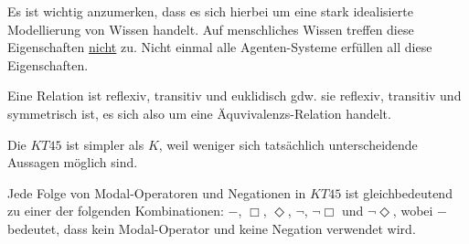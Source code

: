 Es ist wichtig anzumerken, dass es sich hierbei um eine stark idealisierte Modellierung von Wissen handelt.
Auf menschliches Wissen treffen diese Eigenschaften \underline{nicht} zu.
Nicht einmal alle Agenten-Systeme erfüllen all diese Eigenschaften. 


\begin{fact}
	Eine Relation ist reflexiv, transitiv und euklidisch gdw. sie reflexiv, transitiv und symmetrisch ist, es sich also um eine Äquvivalenzs-Relation handelt. 
\end{fact}

Die \ML $KT45$ ist simpler als $K$, weil weniger sich tatsächlich unterscheidende Aussagen möglich sind.

\begin{theorem}
	Jede Folge von Modal-Operatoren und Negationen in $KT45$ ist gleichbedeutend zu einer der folgenden Kombinationen: $-$, $\Box$, $\Diamond$, $\neg$, $\neg \Box$ und $\neg \Diamond$, wobei $-$ bedeutet, dass kein Modal-Operator und keine Negation verwendet wird. 
\end{theorem}


